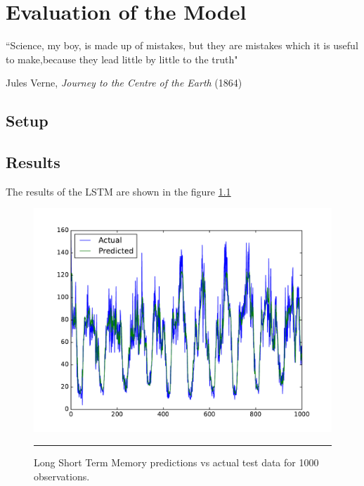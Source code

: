 
\chapter{Evaluation of the Model} %

\label{Chapter5} %


``Science, my boy, is made up of mistakes, but they are mistakes which it is useful to make,because
they lead little by little to the truth"

\begin{flushright}
Jules Verne, \textit{Journey to the Centre of the Earth} (1864)
\end{flushright}


\section{Setup}

\section{Results}

The results of the LSTM are shown in the figure \ref{fig:LstmActualPredicted}

\begin{figure}[htbp]
  \centering
    \includegraphics[width=\textwidth,height=\textheight,keepaspectratio]{Figures/lstm.pdf}
    \rule{35em}{0.5pt}
  \caption[LSTM - Actual vs Predictions]{Long Short Term Memory predictions vs actual test data for
  1000 observations.}
  \label{fig:LstmActualPredicted}
\end{figure}
